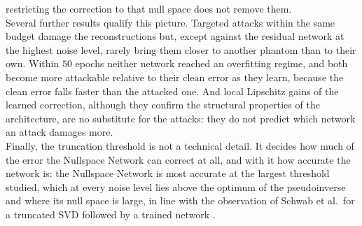 \documentclass{article}
\numberwithin{equation}{section}
\begin{document}
restricting the correction to that null space does not remove them.\\
Several further results qualify this picture. Targeted attacks within the same budget damage the
reconstructions but, except against the residual network at the highest noise level, rarely bring them
closer to another phantom than to their own. Within $50$ epochs neither network reached an
overfitting regime, and both become more attackable relative to their clean error as they learn, because
the clean error falls faster than the attacked one. And local Lipschitz
gains of the learned correction, although they confirm the structural properties of the architecture,
are no substitute for the attacks: they do not predict which network an attack damages more.\\
Finally, the truncation threshold is not a technical detail. It decides how much of the error the
Nullspace Network can correct at all, and with it how accurate the network is: the Nullspace Network is
most accurate at the largest threshold studied, which at every noise level lies above the optimum of the
pseudoinverse and where its null space is large, in line with the observation of Schwab
et al.\ for a truncated SVD followed by a trained network \parencite{schwab2020bigjapan}.
\end{document}
